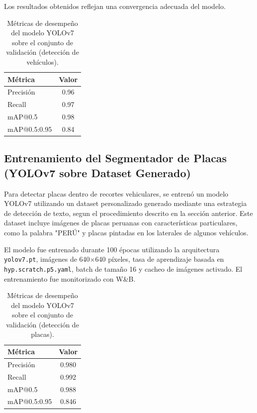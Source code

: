 \documentclass[conference]{IEEEtran}
\begin{document}
Los resultados obtenidos reflejan una convergencia adecuada del modelo.

\begin{table}[h]
\centering
\caption{Métricas de desempeño del modelo YOLOv7 sobre el conjunto de validación (detección de vehículos).}
\begin{tabular}{lc}
\hline
\textbf{Métrica}         & \textbf{Valor} \\
\hline
Precisión               & 0.96 \\
Recall                  & 0.97 \\
mAP@0.5                 & 0.98 \\
mAP@0.5:0.95            & 0.84 \\
\hline
\end{tabular}
\label{tab:final_metrics}
\end{table}


\subsection{Entrenamiento del Segmentador de Placas (YOLOv7 sobre Dataset Generado)}

Para detectar placas dentro de recortes vehiculares, se entrenó un modelo YOLOv7 utilizando un dataset personalizado generado mediante una estrategia de detección de texto, segun el procedimiento descrito en la sección anterior. Este dataset incluye imágenes de placas peruanas con características particulares, como la palabra "PERÚ" y placas pintadas en los laterales de algunos vehículos.

El modelo fue entrenado durante 100 épocas utilizando la arquitectura \texttt{yolov7.pt}, imágenes de 640$\times$640 píxeles, tasa de aprendizaje basada en \texttt{hyp.scratch.p5.yaml}, batch de tamaño 16 y cacheo de imágenes activado. El entrenamiento fue monitorizado con W\&B.



\begin{table}[h]
\centering
\caption{Métricas de desempeño del modelo YOLOv7 sobre el conjunto de validación (detección de placas).}
\begin{tabular}{lc}
\hline
\textbf{Métrica}         & \textbf{Valor} \\
\hline
Precisión               & 0.980 \\
Recall                  & 0.992 \\
mAP@0.5                 & 0.988 \\
mAP@0.5:0.95            & 0.846 \\
\hline
\end{tabular}
\label{tab:final_metrics_plates}
\end{table}
\end{document}
